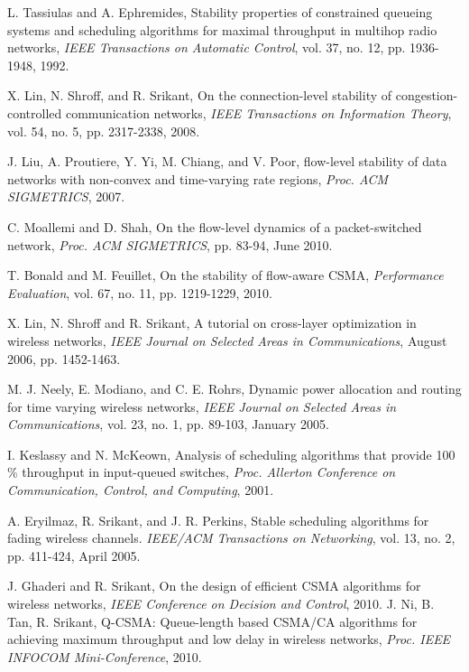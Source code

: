 \documentclass[10pt,onecolumn,draftclsnofoot,journal]{IEEEtran}
\begin{document}
\begin{thebibliography}{99}

L. Tassiulas and A. Ephremides, Stability properties of constrained
queueing systems and scheduling algorithms for maximal throughput in
multihop radio networks, \emph{IEEE Transactions on Automatic Control}, vol. 37, no. 12, pp. 1936-1948, 1992.

X. Lin, N. Shroff, and R. Srikant, On the connection-level stability of congestion-controlled communication networks, \emph{IEEE Transactions on Information Theory}, vol. 54, no. 5, pp. 2317-2338, 2008.



 J. Liu, A. Proutiere, Y. Yi, M. Chiang, and V. Poor, flow-level stability of
data networks with non-convex and time-varying rate regions, \emph{Proc. ACM SIGMETRICS}, 2007.

 C. Moallemi and D. Shah, On the flow-level dynamics of a packet-switched network, \emph{Proc. ACM SIGMETRICS}, pp. 83-94, June 2010.





T. Bonald and M. Feuillet, On the stability of flow-aware CSMA, \emph{Performance Evaluation}, vol. 67, no. 11, pp. 1219-1229, 2010.

 X. Lin, N. Shroff and R. Srikant, A tutorial on cross-layer optimization in wireless networks, \emph{IEEE Journal on Selected Areas in Communications}, August 2006, pp. 1452-1463.

 M. J. Neely, E. Modiano, and C. E. Rohrs, Dynamic power allocation and routing for time varying wireless networks, \emph{IEEE Journal on Selected Areas in Communications}, vol. 23, no. 1, pp. 89-103, January 2005.

 I. Keslassy and N. McKeown, Analysis of scheduling algorithms that provide 100$\%$ throughput
in input-queued switches, \emph{Proc. Allerton Conference on Communication, Control, and Computing}, 2001.





A. Eryilmaz, R. Srikant, and J. R. Perkins, Stable scheduling algorithms
for fading wireless channels. \emph{IEEE/ACM Transactions on Networking}, vol. 13, no. 2, pp. 411-424, April 2005.

J. Ghaderi and R. Srikant, On the design of efficient CSMA algorithms for wireless networks, \emph{IEEE Conference on Decision and Control}, 2010.
 J. Ni, B. Tan, R. Srikant, Q-CSMA: Queue-length based CSMA/CA algorithms for achieving maximum throughput and low delay in wireless networks, \emph{Proc. IEEE INFOCOM Mini-Conference}, 2010.


\end{thebibliography}
\end{document}
